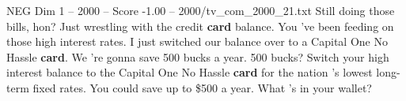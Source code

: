 \begin{textsample}{NEG Dim 1 – 2000 – Score -1.00 – 2000/tv\_com\_2000\_21.txt}  \label{ex:f1_neg_029}
Still doing those bills, hon?
Just wrestling with the credit \textbf{card} balance.
You 've been feeding on those high interest rates.
I just switched our balance over to a Capital One No Hassle \textbf{card}.
We 're gonna save 500 bucks a year. 500 bucks?
Switch your high interest balance to the Capital One No Hassle \textbf{card} for the nation 's lowest long-term fixed rates.
You could save up to \$500 a year.
What 's in your wallet?

\end{textsample}
